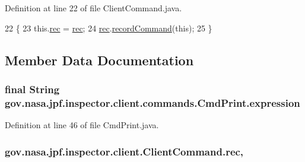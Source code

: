 Definition at line 22 of file Client\+Command.\+java.


\begin{DoxyCode}
22                                                   \{
23     this.\hyperlink{classgov_1_1nasa_1_1jpf_1_1inspector_1_1client_1_1_client_command_af4246f2427035c72a6af45a2c61361f7}{rec} = \hyperlink{classgov_1_1nasa_1_1jpf_1_1inspector_1_1client_1_1_client_command_af4246f2427035c72a6af45a2c61361f7}{rec};
24     \hyperlink{classgov_1_1nasa_1_1jpf_1_1inspector_1_1client_1_1_client_command_af4246f2427035c72a6af45a2c61361f7}{rec}.\hyperlink{classgov_1_1nasa_1_1jpf_1_1inspector_1_1client_1_1_command_recorder_af5f212124179773e46c8b45f1d01a32d}{recordCommand}(\textcolor{keyword}{this});
25   \}
\end{DoxyCode}


\subsection{Member Data Documentation}
\subsubsection[{\texorpdfstring{expression}{expression}}]{\setlength{\rightskip}{0pt plus 5cm}final String gov.\+nasa.\+jpf.\+inspector.\+client.\+commands.\+Cmd\+Print.\+expression\hspace{0.3cm}{\ttfamily [private]}}\hypertarget{classgov_1_1nasa_1_1jpf_1_1inspector_1_1client_1_1commands_1_1_cmd_print_a877a5a85ea359315e9efe4ff55a8e87c}{}\label{classgov_1_1nasa_1_1jpf_1_1inspector_1_1client_1_1commands_1_1_cmd_print_a877a5a85ea359315e9efe4ff55a8e87c}


Definition at line 46 of file Cmd\+Print.\+java.

\subsubsection[{\texorpdfstring{rec}{rec}}]{ gov.\+nasa.\+jpf.\+inspector.\+client.\+Client\+Command.\+rec\hspace{0.3cm}{\ttfamily [protected]}, {\ttfamily [inherited]}}\hypertarget{classgov_1_1nasa_1_1jpf_1_1inspector_1_1client_1_1_client_command_af4246f2427035c72a6af45a2c61361f7}{}\label{classgov_1_1nasa_1_1jpf_1_1inspector_1_1client_1_1_client_command_af4246f2427035c72a6af45a2c61361f7}


